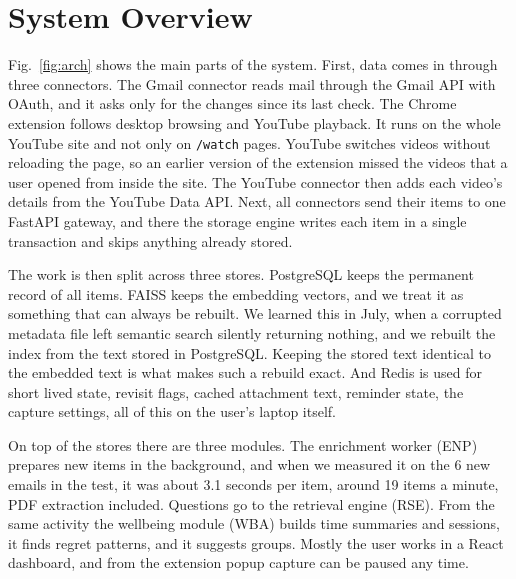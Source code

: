\documentclass[conference]{IEEEtran}
\begin{document}
\section{System Overview}\label{sec:overview}
Fig.~\ref{fig:arch} shows the main parts of the system. First, data comes in through three connectors. The Gmail connector reads mail through the Gmail API with OAuth, and it asks only for the changes since its last check. The Chrome extension follows desktop browsing and YouTube playback. It runs on the whole YouTube site and not only on \texttt{/watch} pages. YouTube switches videos without reloading the page, so an earlier version of the extension missed the videos that a user opened from inside the site. The YouTube connector then adds each video's details from the YouTube Data API. Next, all connectors send their items to one FastAPI gateway, and there the storage engine writes each item in a single transaction and skips anything already stored.

The work is then split across three stores. PostgreSQL keeps the permanent record of all items. FAISS keeps the embedding vectors, and we treat it as something that can always be rebuilt. We learned this in July, when a corrupted metadata file left semantic search silently returning nothing, and we rebuilt the index from the text stored in PostgreSQL. Keeping the stored text identical to the embedded text is what makes such a rebuild exact. And Redis is used for short lived state, revisit flags, cached attachment text, reminder state, the capture settings, all of this on the user's laptop itself.

On top of the stores there are three modules. The enrichment worker (ENP) prepares new items in the background, and when we measured it on the 6 new emails in the test, it was about 3.1 seconds per item, around 19 items a minute, PDF extraction included. Questions go to the retrieval engine (RSE). From the same activity the wellbeing module (WBA) builds time summaries and sessions, it finds regret patterns, and it suggests groups. Mostly the user works in a React dashboard, and from the extension popup capture can be paused any time.
\end{document}
